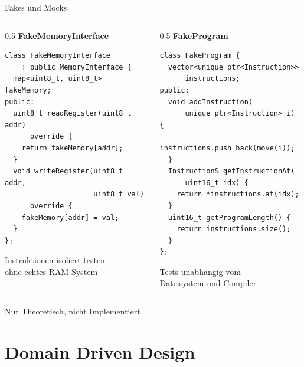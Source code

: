 \documentclass[10pt]{beamer}
\begin{document}
\begin{frame}[fragile]{Fakes und Mocks}
    \begin{columns}
        \begin{column}{0.5\textwidth}
            \textbf{FakeMemoryInterface}
\begin{lstlisting}[language=picassocpp, basicstyle=\ttfamily\tiny]
class FakeMemoryInterface
    : public MemoryInterface {
  map<uint8_t, uint8_t> fakeMemory;
public:
  uint8_t readRegister(uint8_t addr)
      override {
    return fakeMemory[addr];
  }
  void writeRegister(uint8_t addr,
                     uint8_t val)
      override {
    fakeMemory[addr] = val;
  }
};
\end{lstlisting}
            Instruktionen isoliert testen\\
            ohne echtes RAM-System
        \end{column}
        \begin{column}{0.5\textwidth}
            \textbf{FakeProgram}
\begin{lstlisting}[language=picassocpp, basicstyle=\ttfamily\tiny]
class FakeProgram {
  vector<unique_ptr<Instruction>>
      instructions;
public:
  void addInstruction(
      unique_ptr<Instruction> i) {
    instructions.push_back(move(i));
  }
  Instruction& getInstructionAt(
      uint16_t idx) {
    return *instructions.at(idx);
  }
  uint16_t getProgramLength() {
    return instructions.size();
  }
};
\end{lstlisting}
            Tests unabhängig vom\\
            Dateisystem und Compiler
        \end{column}
    \end{columns}
    \vfill
    \begin{small}
        Nur Theoretisch, nicht Implementiert
    \end{small}
\end{frame}

\section{Domain Driven Design}
\end{document}
